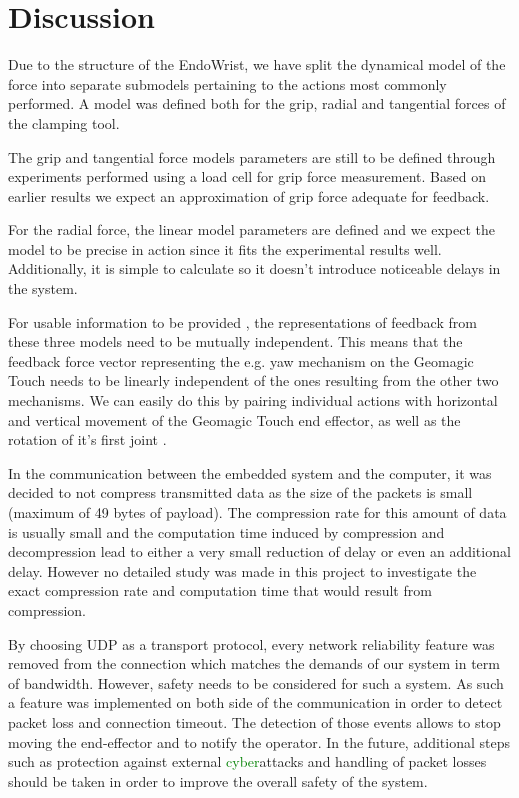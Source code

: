 \section{Discussion}
Due to the structure of the EndoWrist, we have split the dynamical model of the force into separate submodels pertaining to the actions most commonly performed.
A model was defined both for the grip, radial and tangential forces of the clamping tool.

The grip and tangential force models parameters are still to be defined through experiments performed using a load cell for grip force measurement.
Based on earlier results \cite{kim2014dynamic} we expect an approximation of grip force adequate for feedback.

For the radial force, the linear model parameters are defined and we expect the model to be precise in action since it fits the experimental results well.
Additionally, it is simple to calculate so it doesn't introduce noticeable delays in the system.

For usable information to be provided , the representations of feedback from these three models need to be mutually independent.
This means that the feedback force vector representing the e.g. yaw mechanism on the Geomagic Touch needs to be linearly independent of the ones resulting from the other two mechanisms. 
We can easily do this by pairing individual actions with horizontal and vertical movement of the Geomagic Touch end effector, as well as the rotation of it's first joint .

In the communication between the embedded system and the computer, it was decided to not compress transmitted data as the size of the packets is small (maximum of 49 bytes of payload). The compression rate for this amount of data is usually small and the computation time induced by compression and decompression lead to either a very small reduction of delay or even an additional delay. However no detailed study was made in this project to investigate the exact compression rate and computation time that would result from compression.

By choosing UDP as a transport protocol, every network reliability feature was removed from the connection which matches the demands of our system in term of bandwidth. 
However, safety needs to be considered for such a system. 
As such a feature was implemented on both side of the communication in order to detect packet loss and connection timeout. 
The detection of those events allows to stop moving the end-effector and to notify the operator. 
In the future, additional steps such as protection against external \textcolor{green}{cyber}attacks and handling of packet losses should be taken in order to improve the overall safety of the system.
